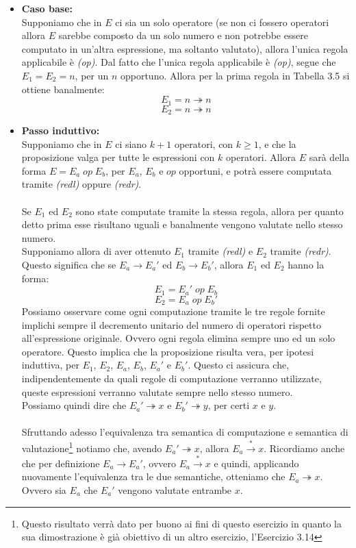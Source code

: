     \begin{itemize}
        \item \textbf{Caso base:}\\
            Supponiamo che in $E$ ci sia un solo operatore (se non ci fossero operatori allora $E$ sarebbe composto da un solo numero e non potrebbe essere computato in un'altra espressione, ma soltanto valutato), allora l'unica regola applicabile è \textit{(op)}. Dal fatto che l'unica regola applicabile è \textit{(op)}, segue che $E_1=E_2=n$, per un $n$ opportuno. Allora per la prima regola in Tabella 3.5 si ottiene banalmente:
            $$E_1 = n \twoheadrightarrow n$$
            $$E_2 = n \twoheadrightarrow n$$
        \item \textbf{Passo induttivo:}\\
            Supponiamo che in $E$ ci siano $k+1$ operatori, con $k \geq 1$, e che la proposizione valga per tutte le espressioni con $k$ operatori. Allora $E$ sarà della forma $E=E_a\; op\; E_b$, per $E_a$, $E_b$ e $op$ opportuni, e potrà essere computata tramite \textit{(redl)} oppure \textit{(redr)}.\\
            \\
            Se $E_1$ ed $E_2$ sono state computate tramite la stessa regola, allora per quanto detto prima esse risultano uguali e banalmente vengono valutate nello stesso numero.\\
            Supponiamo allora di aver ottenuto $E_1$ tramite \textit{(redl)} e $E_2$ tramite \textit{(redr)}. Questo significa che se $E_a \rightarrow E_a'$ ed $E_b \rightarrow E_b'$, allora $E_1$ ed $E_2$ hanno la forma:
            $$E_1 = E_a'\; op\; E_b$$
            $$E_2 = E_a\; op\; E_b'$$
            Possiamo osservare come ogni computazione tramite le tre regole fornite implichi sempre il decremento unitario del numero di operatori rispetto all'espressione originale. Ovvero ogni regola elimina sempre uno ed un solo operatore. Questo implica che la proposizione risulta vera, per ipotesi induttiva, per $E_1$, $E_2$, $E_a$, $E_b$, $E_a'$ e $E_b'$. Questo ci assicura che, indipendentemente da quali regole di computazione verranno utilizzate, queste espressioni verranno valutate sempre nello stesso numero.\\
            Possiamo quindi dire che $E_a' \twoheadrightarrow x$ e $E_b' \twoheadrightarrow y$, per certi $x$ e $y$.\\
            \\
            Sfruttando adesso l'equivalenza tra semantica di computazione e semantica di valutazione\footnote{Questo risultato verrà dato per buono ai fini di questo esercizio in quanto la sua dimostrazione è già obiettivo di un altro esercizio, l'Esercizio 3.14} notiamo che, avendo $E_a' \twoheadrightarrow x$, allora $E_a \xrightarrow{*} x$. Ricordiamo anche che per definizione $E_a \rightarrow E_a'$, ovvero $E_a \xrightarrow{*} x$ e quindi, applicando nuovamente l'equivalenza tra le due semantiche, otteniamo che $E_a \twoheadrightarrow x$. Ovvero sia $E_a$ che $E_a'$ vengono valutate entrambe $x$.\\

\end{itemize}

